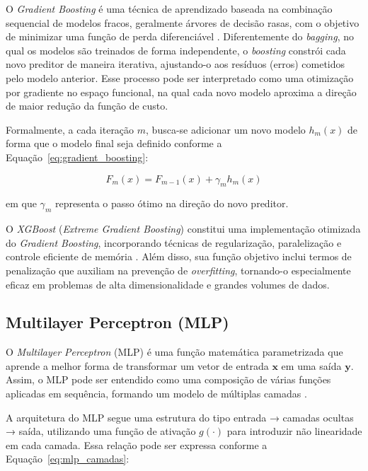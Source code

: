 O \textit{Gradient Boosting} é uma técnica de aprendizado baseada na combinação sequencial de modelos fracos, geralmente árvores de decisão rasas, 
com o objetivo de minimizar uma função de perda diferenciável \cite{Geron2019}. Diferentemente do \textit{bagging}, no qual os modelos são treinados 
de forma independente, o \textit{boosting} constrói cada novo preditor de maneira iterativa, ajustando-o aos resíduos (erros) cometidos pelo modelo anterior. 
Esse processo pode ser interpretado como uma otimização por gradiente no espaço funcional, na qual cada novo modelo 
aproxima a direção de maior redução da função de custo.

Formalmente, a cada iteração $m$, busca-se adicionar um novo modelo $h_m(x)$ de forma que o modelo final seja definido conforme a Equação~\ref{eq:gradient_boosting}:

\begin{equation}
F_m(x) = F_{m-1}(x) + \gamma_m h_m(x)
\label{eq:gradient_boosting}
\end{equation}

em que $\gamma_m$ representa o passo ótimo na direção do novo preditor.

O \textit{XGBoost} (\textit{Extreme Gradient Boosting}) constitui uma implementação otimizada do \textit{Gradient Boosting}, 
incorporando técnicas de regularização, paralelização e controle eficiente de memória \cite{Geron2019}. 
Além disso, sua função objetivo inclui termos de penalização que auxiliam na prevenção de \textit{overfitting}, 
tornando-o especialmente eficaz em problemas de alta dimensionalidade e grandes volumes de dados.

\subsection{Multilayer Perceptron (MLP)}

O \textit{Multilayer Perceptron} (MLP) é uma função matemática parametrizada que 
aprende a melhor forma de transformar um vetor de entrada $\mathbf{x}$ em uma 
saída $\mathbf{y}$. Assim, o MLP pode ser entendido como uma composição de várias 
funções aplicadas em sequência, formando um modelo de múltiplas camadas \cite{Goodfellow2016}.

A arquitetura do MLP segue uma estrutura do tipo entrada → camadas ocultas → saída, 
utilizando uma função de ativação $g(\cdot)$ para introduzir não linearidade em 
cada camada. Essa relação pode ser expressa conforme a Equação~\ref{eq:mlp_camadas}:

